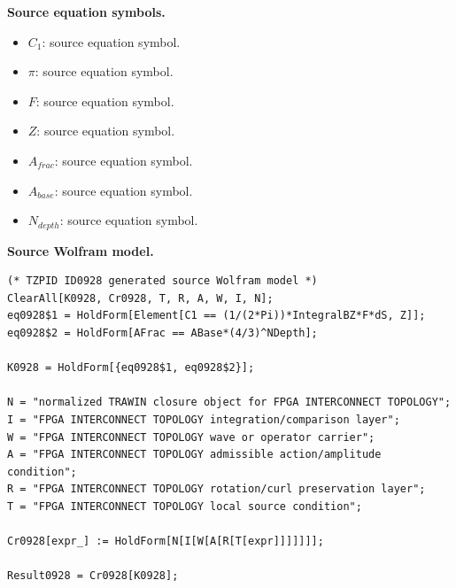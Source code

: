 \begin{minipage}[t]{0.49\linewidth}
\begingroup
\small
\raggedright
\textbf{Source equation symbols.}\par
\begin{itemize}[leftmargin=1.35em,itemsep=1pt,topsep=1pt,parsep=0pt]
    \item $C_1$: source equation symbol.
    \item $\pi$: source equation symbol.
    \item $F$: source equation symbol.
    \item $Z$: source equation symbol.
    \item $A_{frac}$: source equation symbol.
    \item $A_{base}$: source equation symbol.
    \item $N_{depth}$: source equation symbol.
\end{itemize}
\endgroup
\end{minipage}\hfill
\begin{minipage}[t]{0.47\linewidth}
\begingroup
\scriptsize
\raggedright
\textbf{Source Wolfram model.}\par
\begin{Verbatim}[fontsize=\tiny,breaklines=true,breakanywhere=true]
(* TZPID ID0928 generated source Wolfram model *)
ClearAll[K0928, Cr0928, T, R, A, W, I, N];
eq0928$1 = HoldForm[Element[C1 == (1/(2*Pi))*IntegralBZ*F*dS, Z]];
eq0928$2 = HoldForm[AFrac == ABase*(4/3)^NDepth];

K0928 = HoldForm[{eq0928$1, eq0928$2}];

N = "normalized TRAWIN closure object for FPGA INTERCONNECT TOPOLOGY";
I = "FPGA INTERCONNECT TOPOLOGY integration/comparison layer";
W = "FPGA INTERCONNECT TOPOLOGY wave or operator carrier";
A = "FPGA INTERCONNECT TOPOLOGY admissible action/amplitude condition";
R = "FPGA INTERCONNECT TOPOLOGY rotation/curl preservation layer";
T = "FPGA INTERCONNECT TOPOLOGY local source condition";

Cr0928[expr_] := HoldForm[N[I[W[A[R[T[expr]]]]]]];

Result0928 = Cr0928[K0928];
\end{Verbatim}
\endgroup
\end{minipage}

